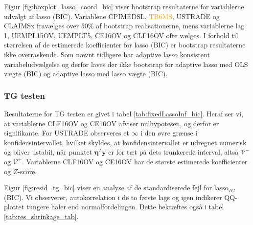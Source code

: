 Figur \ref{fig:boxplot_lasso_coord_bic} viser bootstrap resultaterne for variablerne udvalgt af lasso (BIC).
Variablene \textcolor{cadetblue2}{CPIMEDSL}, \textcolor{orange}{TB6MS}, \textcolor{blue3}{USTRADE} og \textcolor{blue3}{CLAIMSx} fravælges over 50\% af bootstrap realisationerne, mens variablerne \textcolor{blue3}{lag 1}, \textcolor{blue3}{UEMPL15OV}, \textcolor{blue3}{UEMPLT5}, \textcolor{blue3}{CE16OV} og \textcolor{blue3}{CLF16OV} ofte vælges.
I forhold til størrelsen af de estimerede koefficienter for lasso (BIC) er bootstrap resultaterne ikke overraskende. 
Som nævnt tidligere har adaptive lasso konsistent variabeludvælgelse og derfor laves der ikke bootstrap for adaptive lasso med OLS vægte (BIC) og adaptive lasso med lasso vægte (BIC). 

\subsubsection{TG testen}
Resultaterne for TG testen er givet i tabel \ref{tab:fixedLassoInf_bic}.
Heraf ser vi, at variablerne \textcolor{blue3}{CLF16OV} og \textcolor{blue3}{CE16OV} afviser nulhypotesen, og derfor er signifikante.
For \textcolor{blue3}{USTRADE} observeres et $\infty$ i den øvre grænse i konfidensintervallet, hvilket skyldes, at konfidensintervallet er udregnet numerisk og bliver ustabil, når punktet $\boldsymbol\eta^T \mathbf{y}$ er for tæt på dets trunkerede interval, altså $\mathcal{V}^-$ og $\mathcal{V}^+$. 
Variablerne \textcolor{blue3}{CLF16OV} og \textcolor{blue3}{CE16OV} har de største estimerede koefficienter og $Z$-score.




Figur \ref{fig:resid_tg_bic} viser en analyse af de standardiserede fejl for lasso$_{TG}$ (BIC). 
Vi observerer, autokorrelation i de to første lags og igen indikerer QQ-plottet tungere haler end normalfordelingen. 
Dette bekræftes også i tabel \ref{tab:res_shrinkage_tab}.

